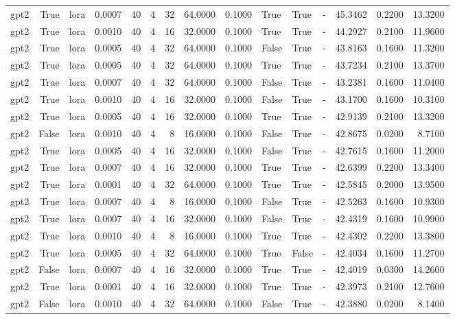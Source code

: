 \begin{tabular}{lrlrrrrrrlllrrr}
gpt2 & True & lora & 0.0007 & 40 & 4 & 32 & 64.0000 & 0.1000 & True & True & - & 45.3462 & 0.2200 & 13.3200 \\
gpt2 & True & lora & 0.0010 & 40 & 4 & 16 & 32.0000 & 0.1000 & True & True & - & 44.2927 & 0.2100 & 11.9600 \\
gpt2 & True & lora & 0.0005 & 40 & 4 & 32 & 64.0000 & 0.1000 & False & True & - & 43.8163 & 0.1600 & 11.3200 \\
gpt2 & True & lora & 0.0005 & 40 & 4 & 32 & 64.0000 & 0.1000 & True & True & - & 43.7234 & 0.2100 & 13.3700 \\
gpt2 & True & lora & 0.0007 & 40 & 4 & 32 & 64.0000 & 0.1000 & False & True & - & 43.2381 & 0.1600 & 11.0400 \\
gpt2 & True & lora & 0.0010 & 40 & 4 & 16 & 32.0000 & 0.1000 & False & True & - & 43.1700 & 0.1600 & 10.3100 \\
gpt2 & True & lora & 0.0005 & 40 & 4 & 16 & 32.0000 & 0.1000 & True & True & - & 42.9139 & 0.2100 & 13.3200 \\
gpt2 & False & lora & 0.0010 & 40 & 4 & 8 & 16.0000 & 0.1000 & False & True & - & 42.8675 & 0.0200 & 8.7100 \\
gpt2 & True & lora & 0.0005 & 40 & 4 & 16 & 32.0000 & 0.1000 & False & True & - & 42.7615 & 0.1600 & 11.2000 \\
gpt2 & True & lora & 0.0007 & 40 & 4 & 16 & 32.0000 & 0.1000 & True & True & - & 42.6399 & 0.2200 & 13.3400 \\
gpt2 & True & lora & 0.0001 & 40 & 4 & 32 & 64.0000 & 0.1000 & True & True & - & 42.5845 & 0.2000 & 13.9500 \\
gpt2 & True & lora & 0.0007 & 40 & 4 & 8 & 16.0000 & 0.1000 & False & True & - & 42.5263 & 0.1600 & 10.9300 \\
gpt2 & True & lora & 0.0007 & 40 & 4 & 16 & 32.0000 & 0.1000 & False & True & - & 42.4319 & 0.1600 & 10.9900 \\
gpt2 & True & lora & 0.0010 & 40 & 4 & 8 & 16.0000 & 0.1000 & True & True & - & 42.4302 & 0.2200 & 13.3800 \\
gpt2 & True & lora & 0.0005 & 40 & 4 & 32 & 64.0000 & 0.1000 & True & False & - & 42.4034 & 0.1600 & 11.2700 \\
gpt2 & False & lora & 0.0007 & 40 & 4 & 16 & 32.0000 & 0.1000 & True & True & - & 42.4019 & 0.0300 & 14.2600 \\
gpt2 & True & lora & 0.0001 & 40 & 4 & 16 & 32.0000 & 0.1000 & True & True & - & 42.3973 & 0.2100 & 12.7600 \\
gpt2 & False & lora & 0.0010 & 40 & 4 & 32 & 64.0000 & 0.1000 & False & True & - & 42.3880 & 0.0200 & 8.1400 \\

\end{tabular}
